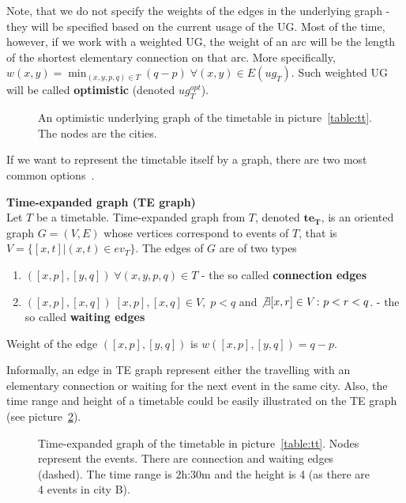     \noindent Note, that we do not specify the weights of the edges in the underlying graph - they will be specified based on the current usage of the UG. Most of the time, however, if we work with a weighted UG, the weight of an arc will be the length of the shortest elementary connection on that arc. More specifically, $w(x, y) = \min_{(x, y, p, q) \in T} (q - p) \; \forall (x, y) \in E(ug_{T})$. Such weighted UG will be called \textbf{optimistic} (denoted $ug_{T}^{opt}$).
    
    \begin{figure}[h!]
        \begin{center}
        \end{center}
		\caption{\label{fig:ug} An optimistic underlying graph of the timetable in picture~\ref{table:tt}. The nodes are the \textcolor{city-clr}{cities}.}
	\end{figure}
	
	\noindent If we want to represent the timetable itself by a graph, there are two most common options~\cite{timetablemodelsalgs07}.
	
	\begin{definition}
		\textbf{Time-expanded graph (TE graph)} \\
        Let $T$ be a timetable. Time-expanded graph from $T$, denoted $\bm{te_{T}}$, is an oriented graph $G = (V, E)$ whose vertices correspond to events of $T$, that is $V = \{[x, t]| (x, t) \in ev_{T}\}$. The edges of $G$ are of two types
        \begin{enumerate}
            \item $([x, p], [y, q]) \; \forall (x, y, p, q) \in T$ - the so called \textbf{connection edges}
            \item $([x, p], [x, q]) \; [x, p], [x, q] \in V, \; p < q$ and $\not \exists [x, r] \in V\colon p < r < q$. - the so called \textbf{waiting edges}
		\end{enumerate}
        Weight of the edge $([x, p], [y, q])$ is $w([x, p], [y, q]) = q - p$.
	\end{definition}
	
	\noindent Informally, an edge in TE graph represent either the travelling with an elementary connection or waiting for the next event in the same city. Also, the time range and height of a timetable could be easily illustrated on the TE graph (see picture~\ref{pic:te}). 
	
	\begin{figure}[h!]
	    \begin{center}
	    \end{center}
    	\caption{\label{pic:te} Time-expanded graph of the timetable in picture~\ref{table:tt}. Nodes represent the \textcolor{event-clr}{events}. There are \textcolor{elcon-clr}{connection} and \textcolor{waiting-clr}{waiting} edges (dashed). The time range is 2h:30m and the height is 4 (as there are 4 events in city B).}
	\end{figure}
        
